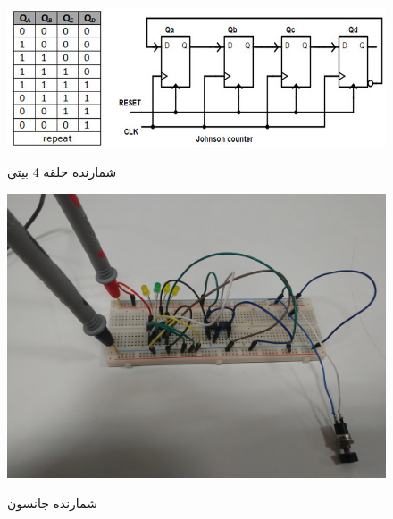 \documentclass[twoside]{article}
\begin{document}
	\begin{figure}[h!]
		\begin{center}
			\includegraphics[scale=0.6]{johnson_ring_counter}‎
			\caption{شمارنده حلقه 4 بیتی}
		\end{center}
	\end{figure} 
	
	\begin{figure}[h!]
		\begin{center}
			\includegraphics[scale=0.05]{j1}‎
			\caption{شمارنده جانسون}
		\end{center}
	\end{figure} 
\end{document}
